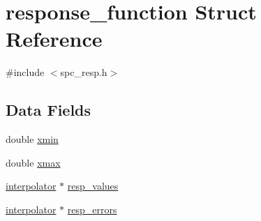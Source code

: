 \hypertarget{structresponse__function}{
\section{response\_\-function Struct Reference}
\label{structresponse__function}
}


{\ttfamily \#include $<$spc\_\-resp.h$>$}\subsection*{Data Fields}
\begin{DoxyCompactItemize}
\item 
double \hyperlink{structresponse__function_a75d90be05a1402c3afe4563a16289160}{xmin}
\item 
double \hyperlink{structresponse__function_a5af3cf2a845502be139d4ecfb620c731}{xmax}
\item 
\hyperlink{structinterpolator}{interpolator} $\ast$ \hyperlink{structresponse__function_a67e56fb3a2affd39926091ff4fd57d5a}{resp\_\-values}
\item 
\hyperlink{structinterpolator}{interpolator} $\ast$ \hyperlink{structresponse__function_a4a8113d578a58810c2d396bd2ea31920}{resp\_\-errors}
\end{DoxyCompactItemize}


